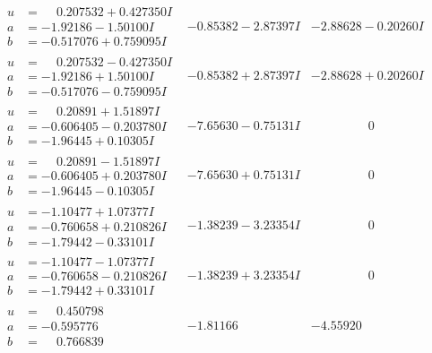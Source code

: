 \documentclass[1p]{elsarticle_modified}
\theoremstyle{definition}
\begin{document}
$$\begin{array}{c|c|c}
\begin{aligned}
u &= \phantom{-}0.207532 + 0.427350 I \\
a &= -1.92186 - 1.50100 I \\
b &= -0.517076 + 0.759095 I\end{aligned}
 & -0.85382 - 2.87397 I & -2.88628 - 0.20260 I \\ \hline\begin{aligned}
u &= \phantom{-}0.207532 - 0.427350 I \\
a &= -1.92186 + 1.50100 I \\
b &= -0.517076 - 0.759095 I\end{aligned}
 & -0.85382 + 2.87397 I & -2.88628 + 0.20260 I \\ \hline\begin{aligned}
u &= \phantom{-}0.20891 + 1.51897 I \\
a &= -0.606405 - 0.203780 I \\
b &= -1.96445 + 0.10305 I\end{aligned}
 & -7.65630 - 0.75131 I & \phantom{-0.000000 } 0 \\ \hline\begin{aligned}
u &= \phantom{-}0.20891 - 1.51897 I \\
a &= -0.606405 + 0.203780 I \\
b &= -1.96445 - 0.10305 I\end{aligned}
 & -7.65630 + 0.75131 I & \phantom{-0.000000 } 0 \\ \hline\begin{aligned}
u &= -1.10477 + 1.07377 I \\
a &= -0.760658 + 0.210826 I \\
b &= -1.79442 - 0.33101 I\end{aligned}
 & -1.38239 - 3.23354 I & \phantom{-0.000000 } 0 \\ \hline\begin{aligned}
u &= -1.10477 - 1.07377 I \\
a &= -0.760658 - 0.210826 I \\
b &= -1.79442 + 0.33101 I\end{aligned}
 & -1.38239 + 3.23354 I & \phantom{-0.000000 } 0 \\ \hline\begin{aligned}
u &= \phantom{-}0.450798\phantom{ +0.000000I} \\
a &= -0.595776\phantom{ +0.000000I} \\
b &= \phantom{-}0.766839\phantom{ +0.000000I}\end{aligned}
 & -1.81166\phantom{ +0.000000I} & -4.55920\phantom{ +0.000000I}\\

\end{array}$$
\end{document}
